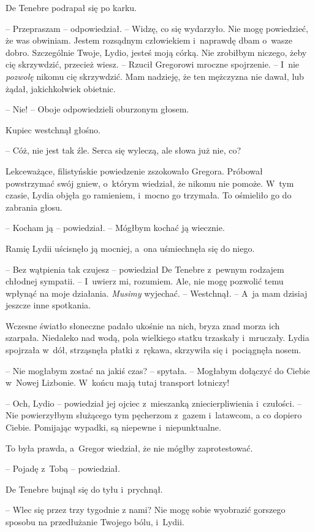\documentclass[oneside,polish,12pt,sfheadings]{mwbk}
\begin{document}
De Tenebre podrapał się po karku.

-- Przepraszam -- odpowiedział. -- Widzę, co się wydarzyło. Nie mogę
powiedzieć, że was obwiniam. Jestem rozsądnym człowiekiem i~naprawdę
dbam o~wasze dobro. Szczególnie Twoje, Lydio, jesteś moją córką. Nie
zrobiłbym niczego, żeby cię skrzywdzić, przecież wiesz. -- Rzucił
Gregorowi mroczne spojrzenie. -- I~nie \emph{pozwolę} nikomu cię
skrzywdzić. Mam nadzieję, że ten mężczyzna nie dawał, lub żądał,
jakichkolwiek obietnic.

-- Nie! -- Oboje odpowiedzieli oburzonym głosem.

Kupiec westchnął głośno. 

-- Cóż, nie jest tak źle. Serca się wyleczą, ale
słowa już nie, co?

Lekceważące, filistyńskie powiedzenie zszokowało Gregora. Próbował
powstrzymać swój gniew, o~którym wiedział, że nikomu nie pomoże. W~tym
czasie, Lydia objęła go ramieniem, i~mocno go trzymała. To ośmieliło go
do zabrania głosu.

-- Kocham ją -- powiedział. -- Mógłbym kochać ją wiecznie.

Ramię Lydii uścisnęło ją mocniej, a~ona uśmiechnęła się do niego.

-- Bez wątpienia tak czujesz -- powiedział De Tenebre z~pewnym rodzajem
chłodnej sympatii. -- I~uwierz mi, rozumiem. Ale, nie mogę pozwolić temu
wpłynąć na moje działania. \emph{Musimy} wyjechać. -- Westchnął. -- A~ja
mam dzisiaj jeszcze inne spotkania.

Wczesne światło słoneczne padało ukośnie na nich, bryza znad morza ich
szarpała. Niedaleko nad wodą, pola wielkiego statku trzaskały i~mruczały. Lydia spojrzała w~dół, strząsnęła płatki z~rękawa, skrzywiła
się i~pociągnęła nosem.

-- Nie mogłabym zostać na jakiś czas? -- spytała. -- Mogłabym dołączyć do
Ciebie w~Nowej Lizbonie. W~końcu mają tutaj transport lotniczy!

-- Och, Lydio -- powiedział jej ojciec z~mieszanką zniecierpliwienia i~czułości. -- Nie powierzyłbym służącego tym pęcherzom z~gazem i~latawcom,
a co dopiero Ciebie. Pomijając wypadki, są niepewne i~niepunktualne.

To była prawda, a~Gregor wiedział, że nie mógłby zaprotestować.

-- Pojadę z~Tobą -- powiedział.

De Tenebre bujnął się do tyłu i~prychnął. 

-- Wlec się przez trzy tygodnie
z nami? Nie mogę sobie wyobrazić gorszego sposobu na przedłużanie
Twojego bólu, i~Lydii.
\end{document}
